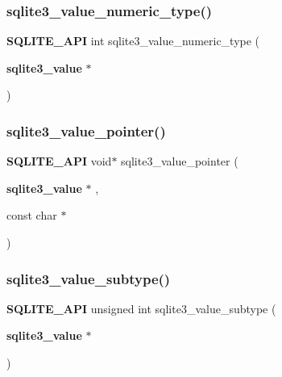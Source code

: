 \mbox{\label{sqlite3_8h_a27ddcc00adc41cc2b4c30a88958acd9a}} 
\subsubsection{sqlite3\_value\_numeric\_type()}
{\footnotesize\ttfamily \textbf{ S\+Q\+L\+I\+T\+E\+\_\+\+A\+PI} int sqlite3\+\_\+value\+\_\+numeric\+\_\+type (\begin{DoxyParamCaption}\item[{\textbf{ sqlite3\+\_\+value} $\ast$}]{ }\end{DoxyParamCaption})}

\mbox{\label{sqlite3_8h_addd85a51be217e7c34803c9e8fb3d142}} 
\subsubsection{sqlite3\_value\_pointer()}
{\footnotesize\ttfamily \textbf{ S\+Q\+L\+I\+T\+E\+\_\+\+A\+PI} void$\ast$ sqlite3\+\_\+value\+\_\+pointer (\begin{DoxyParamCaption}\item[{\textbf{ sqlite3\+\_\+value} $\ast$}]{,  }\item[{const char $\ast$}]{ }\end{DoxyParamCaption})}

\mbox{\label{sqlite3_8h_a9fdb4f6d95665bc92d53980ebdc67202}} 
\subsubsection{sqlite3\_value\_subtype()}
{\footnotesize\ttfamily \textbf{ S\+Q\+L\+I\+T\+E\+\_\+\+A\+PI} unsigned int sqlite3\+\_\+value\+\_\+subtype (\begin{DoxyParamCaption}\item[{\textbf{ sqlite3\+\_\+value} $\ast$}]{ }\end{DoxyParamCaption})}

\mbox{\label{sqlite3_8h_a78e024c17b349c4d40fd82d0e02a4a2c}} 
